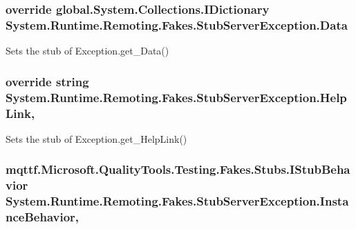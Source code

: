 \hypertarget{class_system_1_1_runtime_1_1_remoting_1_1_fakes_1_1_stub_server_exception_a102cf2f38f738edbe32f07ad241535a0}{
\subsubsection[{Data}]{\setlength{\rightskip}{0pt plus 5cm}override global.\-System.\-Collections.\-I\-Dictionary System.\-Runtime.\-Remoting.\-Fakes.\-Stub\-Server\-Exception.\-Data\hspace{0.3cm}{\ttfamily [get]}}}\label{class_system_1_1_runtime_1_1_remoting_1_1_fakes_1_1_stub_server_exception_a102cf2f38f738edbe32f07ad241535a0}


Sets the stub of Exception.\-get\-\_\-\-Data()

\hypertarget{class_system_1_1_runtime_1_1_remoting_1_1_fakes_1_1_stub_server_exception_aa3637549a7f9c56ef1c736158edce2f8}{
\subsubsection[{Help\-Link}]{\setlength{\rightskip}{0pt plus 5cm}override string System.\-Runtime.\-Remoting.\-Fakes.\-Stub\-Server\-Exception.\-Help\-Link\hspace{0.3cm}{\ttfamily [get]}, {\ttfamily [set]}}}\label{class_system_1_1_runtime_1_1_remoting_1_1_fakes_1_1_stub_server_exception_aa3637549a7f9c56ef1c736158edce2f8}


Sets the stub of Exception.\-get\-\_\-\-Help\-Link()

\hypertarget{class_system_1_1_runtime_1_1_remoting_1_1_fakes_1_1_stub_server_exception_a915cdf3f36c29df5add371b7709dd9d0}{
\subsubsection[{Instance\-Behavior}]{\setlength{\rightskip}{0pt plus 5cm}mqttf.\-Microsoft.\-Quality\-Tools.\-Testing.\-Fakes.\-Stubs.\-I\-Stub\-Behavior System.\-Runtime.\-Remoting.\-Fakes.\-Stub\-Server\-Exception.\-Instance\-Behavior\hspace{0.3cm}{\ttfamily [get]}, {\ttfamily [set]}}}\label{class_system_1_1_runtime_1_1_remoting_1_1_fakes_1_1_stub_server_exception_a915cdf3f36c29df5add371b7709dd9d0}


